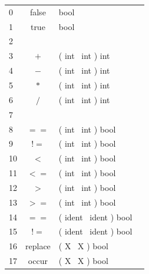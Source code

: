 
\begin{center}
\tablelasttail{\hline}
\label{Built-in codes}
\par
\begin{supertabular}{||l||c|l|l||}
0               & false         & bool                  & \\
1               & true          & bool                  & \\
2 &&&\\
3               & $+$           & ( int ~int ) int      & \\
4               & $-$           & ( int ~int ) int      & \\
5               & $*$           & ( int ~int ) int      & \\
6               & $/$           & ( int ~int ) int      & \\
7 &&&\\
8               & $==$          &( int ~int ) bool      & \\
9               & $!=$          &( int ~int ) bool      & \\
10              & $<$           &( int ~int ) bool      & \\
11              & $<=$          &( int ~int ) bool      & \\
12              & $>$           &( int ~int ) bool      & \\
13              & $>=$          &( int ~int ) bool      & \\
14              & $==$          &( ident ~ident ) bool  & \\
15              & $!=$          &( ident ~ident ) bool  & \\
16              & replace       &( X ~X ) bool  & \\
17              & occur         &( X ~X ) bool  & \\

\end{supertabular}
\end{center}
